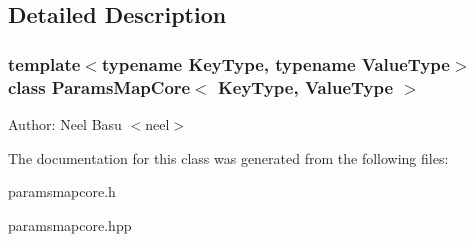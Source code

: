\subsection{Detailed Description}
\subsubsection*{template$<$typename KeyType, typename ValueType$>$ class ParamsMapCore$<$ KeyType, ValueType $>$}

\begin{Desc}
\item[Author:]Neel Basu $<$neel$>$ \end{Desc}


The documentation for this class was generated from the following files:\begin{CompactItemize}
\item 
paramsmapcore.h\item 
paramsmapcore.hpp\end{CompactItemize}
